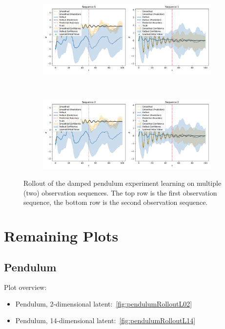	\begin{figure}
		\centering
		\begin{subfigure}{\linewidth}
			\includegraphics[width=\linewidth]{figures/results/single-vs-multi-sequence/pendulum-damped-multi/rollout-observations-N0.pdf}
		\end{subfigure} \\
		\begin{subfigure}{\linewidth}
			\includegraphics[width=\linewidth]{figures/results/single-vs-multi-sequence/pendulum-damped-multi/rollout-observations-N1.pdf}
		\end{subfigure}
		\caption{Rollout of the damped pendulum experiment learning on multiple (two) observation sequences. The top row is the first observation sequence, the bottom row is the second observation sequence.}
		\label{fig:plotsMultiSequence}
	\end{figure}

\section{Remaining Plots}
	\label{app:remainingPlots}

	\subsection{Pendulum}
		Plot overview:
		\begin{itemize}
			\item Pendulum, 2-dimensional latent:~\autoref{fig:pendulumRolloutL02}
			\item Pendulum, 14-dimensional latent:~\autoref{fig:pendulumRolloutL14}
		\end{itemize}

